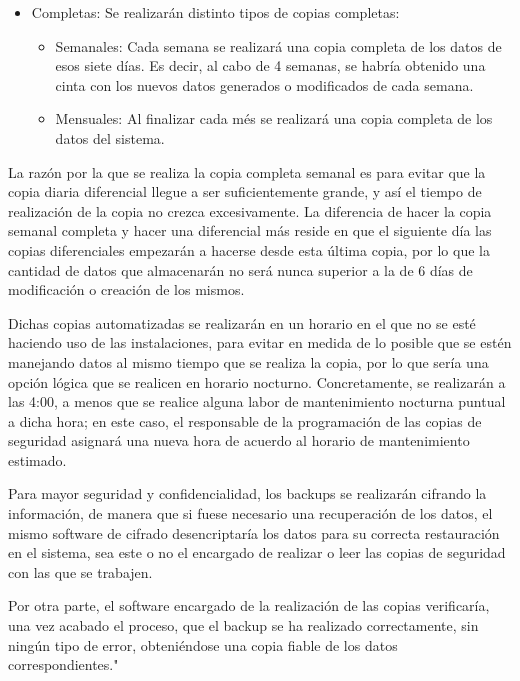 \documentclass[a4paper,11pt,bibtotoc,noliststotoc]{scrbook}
\begin{document}
\begin{itemize}
\begin{itemize}
\begin{itemize}
\item Completas: Se realizarán distinto tipos de copias completas:

	\begin{itemize}
	\item Semanales: Cada semana se realizará una copia completa de los datos de esos siete días. Es decir, al cabo de 4 semanas, se habría obtenido una cinta con los nuevos datos generados o modificados de cada semana.
	\item Mensuales: Al finalizar cada més se realizará una copia completa de los datos del sistema.
	\end{itemize}

\end{itemize}

La razón por la que se realiza la copia completa semanal es para evitar que la copia diaria diferencial llegue a ser suficientemente grande, y así el tiempo de realización de la copia no crezca excesivamente. La diferencia de hacer la copia semanal completa y hacer una diferencial más reside en que el siguiente día las copias diferenciales empezarán a hacerse desde esta última copia, por lo que la cantidad de datos que almacenarán no será nunca superior a la de 6 días de modificación o creación de los mismos.

Dichas copias automatizadas se realizarán en un horario en el que no se esté haciendo uso de las instalaciones, para evitar en medida de lo posible que se estén manejando datos al mismo tiempo que se realiza la copia, por lo que sería una opción lógica que se realicen en horario nocturno. Concretamente, se realizarán a las 4:00, a menos que se realice alguna labor de mantenimiento nocturna puntual a dicha hora; en este caso, el responsable de la programación de las copias de seguridad asignará una nueva hora de acuerdo al horario de mantenimiento estimado.

Para mayor seguridad y confidencialidad, los backups se realizarán cifrando la información, de manera que si fuese necesario una recuperación de los datos, el mismo software de cifrado desencriptaría los datos para su correcta restauración en el sistema, sea este o no el encargado de realizar o leer las copias de seguridad con las que se trabajen.

Por otra parte, el software encargado de la realización de las copias verificaría, una vez acabado el proceso, que el backup se ha realizado correctamente, sin ningún tipo de error, obteniéndose una copia fiable de los datos correspondientes."


\end{itemize}
\end{itemize}
\end{document}
